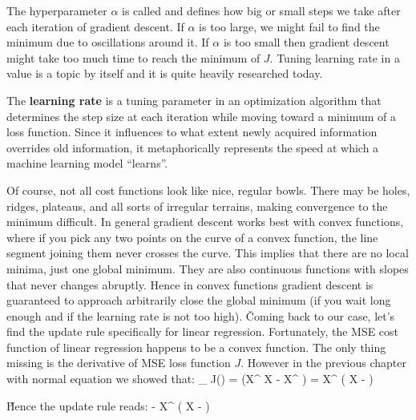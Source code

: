 \vspace{-9pt}


The hyperparameter $\alpha$ is called  and defines how big or small steps we take after each
iteration of gradient descent. If $\alpha$ is too large, we might fail to find the minimum due to oscillations around
it. If $\alpha$ is too small then gradient descent might take too much time to reach the minimum of $J$. Tuning
learning rate in a  value is a topic by itself and it is quite heavily researched today.

The \textbf{learning rate} is a tuning parameter in an optimization algorithm that determines the step size at each
iteration while moving toward a minimum of a loss function. Since it influences to what extent newly acquired
information overrides old information, it metaphorically represents the speed at which a machine learning model
``learns''.
\ed

\vspace{-12pt}


Of course, not all cost functions look like nice, regular bowls. There may be holes, ridges, plateaus, and all sorts
of irregular terrains, making convergence to the minimum difficult. In general gradient descent works best with
convex functions, where if you pick any two points on the curve of a convex function, the line segment joining them
never crosses the curve. This implies that there are no local minima, just one global minimum. They are also
continuous functions with slopes that never changes abruptly. Hence in convex functions gradient descent is
guaranteed to approach arbitrarily close the global minimum (if you wait long enough and if the learning rate is not
too high). \v

Coming back to our case, let's find the update rule specifically for linear regression. Fortunately, the MSE cost
function of linear regression happens to be a convex function. The only thing missing is the derivative of MSE loss
function $J$. However in the previous chapter with normal equation we showed that:
\bse
\nabla_{} J()
=  \Big(X^{\intercal} X - X^{\intercal}  \Big)
=  X^{\intercal} \Big( X - \Big)
\ese

\v

Hence the update rule reads:
\bse
{} \coloneqq {} -  X^{\intercal} \Big( X  - \Big)
\ese

